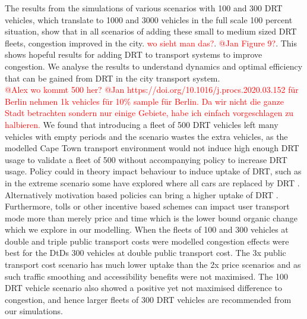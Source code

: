 \documentclass[a4paper]{article}
\begin{document}
The results from the simulations of various scenarios with 100 and 300 DRT vehicles, which translate to 1000 and 3000 vehicles in the full scale 100 percent situation, show that in all scenarios of adding these small to medium sized DRT fleets, congestion improved in the city. \textcolor{red}{wo sieht man das?}. \textcolor{red}{@Jan Figure 9?}.  This shows hopeful results for adding DRT to transport systems to improve congestion. We analyse the results to understand dynamics and optimal efficiency that can be gained from DRT in the city transport system.\\
\textcolor{red}{@Alex wo kommt 500 her?} \textcolor{red}{@Jan https://doi.org/10.1016/j.procs.2020.03.152 für Berlin nehmen 1k vehicles für 10\% sample für Berlin. Da wir nicht die ganze Stadt betrachten sondern nur einige Gebiete, habe ich einfach vorgeschlagen zu halbieren.}
We found that introducing a fleet of 500 DRT vehicles left many vehicles with empty periods and the scenario wastes the extra vehicles, as the modelled Cape Town transport environment would not induce high enough DRT usage to validate a fleet of 500 without accompanying policy to increase DRT usage. Policy could in theory impact behaviour to induce uptake of DRT, such as in the extreme scenario some have explored where all cars are replaced by DRT \citep{Ben-dor, maciejewski2016congestion}. Alternatively motivation based policies can bring a higher uptake of DRT \citep{maggi2021price}. Furthermore, tolls or other incentive based schemes can impact user transport mode more than merely price and time which is the lower bound organic change which we explore in our modelling. When the fleets of 100 and 300 vehicles at double and triple public transport costs were modelled congestion effects were best for the DtDs 300 vehicles at double public transport cost. The 3x public transport cost scenario has much lower uptake than the 2x price scenarios and as such traffic smoothing and accessibility benefits were not maximised. The 100 DRT vehicle scenario also showed a positive yet not maximised difference to congestion, and hence larger fleets of 300 DRT vehicles are recommended from our simulations.\\
\end{document}
